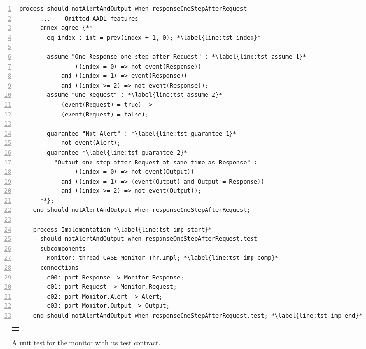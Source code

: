 \documentclass[global,twocolumn]{svjour}
\begin{document}
\newsavebox{\tst}
\begin{lrbox}{\tst}
  \begin{lstlisting}[style=agree,numbers=left]
    process should_notAlertAndOutput_when_responseOneStepAfterRequest
      ... -- Omitted AADL features
      annex agree {**
        eq index : int = prev(index + 1, 0); *\label{line:tst-index}*

        assume "One Response one step after Request" : *\label{line:tst-assume-1}*
                ((index = 0) => not event(Response))
            and ((index = 1) => event(Response))
            and ((index >= 2) => not event(Response));
        assume "One Request" : *\label{line:tst-assume-2}*
            (event(Request) = true) ->
            (event(Request) = false);

        guarantee "Not Alert" : *\label{line:tst-guarantee-1}*
            not event(Alert);
        guarantee *\label{line:tst-guarantee-2}*
          "Output one step after Request at same time as Response" :
                ((index = 0) => not event(Output))
            and ((index = 1) => (event(Output) and Output = Response))
            and ((index >= 2) => not event(Output));
      **};
    end should_notAlertAndOutput_when_responseOneStepAfterRequest;

    process Implementation *\label{line:tst-imp-start}*
      should_notAlertAndOutput_when_responseOneStepAfterRequest.test
      subcomponents
        Monitor: thread CASE_Monitor_Thr.Impl; *\label{line:tst-imp-comp}*
      connections
        c00: port Response -> Monitor.Response;
        c01: port Request -> Monitor.Request;
        c02: port Monitor.Alert -> Alert;
        c03: port Monitor.Output -> Output;
    end should_notAlertAndOutput_when_responseOneStepAfterRequest.test; *\label{line:tst-imp-end}*
  \end{lstlisting}
\end{lrbox}

\begin{figure}
  \begin{center}
    \begin{tabular}{c}
      \resizebox{\columnwidth}{!}{\usebox{\tst}} \\
    \end{tabular}
  \end{center}
  \caption{A unit test for the monitor with its test contract.}
  \label{fig:test}
\end{figure}
\end{document}

